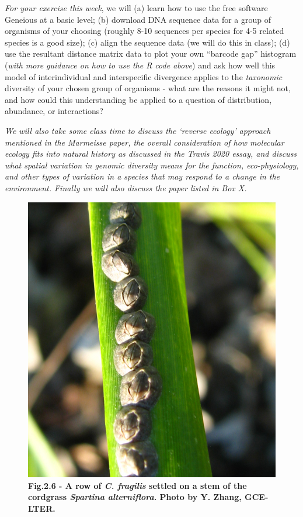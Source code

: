 \documentclass[
]{article}
\begin{document}
\emph{For your exercise this week}, we will (a) learn how to use the
free software Geneious at a basic level; (b) download DNA sequence data
for a group of organisms of your choosing (roughly 8-10 sequences per
species for 4-5 related species is a good size); (c) align the sequence
data (we will do this in class); (d) use the resultant distance matrix
data to plot your own ``barcode gap'' histogram (\emph{with more
guidance on how to use the R code above}) and ask how well this model of
interindividual and interspecific divergence applies to the
\emph{taxonomic} diversity of your chosen group of organisms - what are
the reasons it might not, and how could this understanding be applied to
a question of distribution, abundance, or interactions?

\emph{We will also take some class time to discuss the `reverse ecology'
approach mentioned in the Marmeisse paper, the overall consideration of
how molecular ecology fits into natural history as discussed in the
Travis 2020 essay, and discuss what spatial variation in genomic
diversity means for the function, eco-physiology, and other types of
variation in a species that may respond to a change in the environment.
Finally we will also discuss the paper listed in Box X.}

\begin{figure}
\centering
\includegraphics{MEImages/Cfrag.jpg}
\caption{\textbf{Fig.2.6 - A row of \emph{C. fragilis} settled on a stem
of the cordgrass \emph{Spartina alterniflora}. Photo by Y. Zhang,
GCE-LTER.}}
\end{figure}
\end{document}
